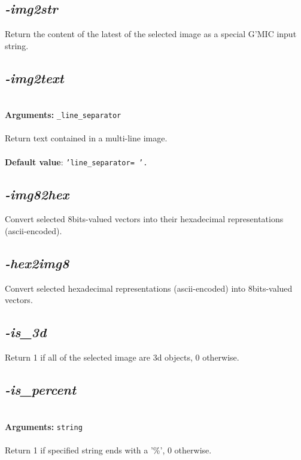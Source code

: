 \documentclass[a4paper,11pt,twoside]{book}
\begin{document}
\subsection{\emph{-img2str} }\vspace*{-0.5em}
Return the content of the latest of the selected image as a special G'MIC input string.


\subsection{\emph{-img2text} }\vspace*{-0.5em}
~\\\textbf{Arguments: } 
{\small \texttt{\_line\_separator}}\\~\\
Return text contained in a multi-line image.
~\\~\\\textbf{Default value}: {\small \texttt{'line\_separator= '.}}


\subsection{\emph{-img82hex} }\vspace*{-0.5em}
Convert selected 8bits-valued vectors into their hexadecimal representations (ascii-encoded).


\subsection{\emph{-hex2img8} }\vspace*{-0.5em}
Convert selected hexadecimal representations (ascii-encoded) into 8bits-valued vectors.


\subsection{\emph{-is\_3d} }\vspace*{-0.5em}
Return 1 if all of the selected image are 3d objects, 0 otherwise.


\subsection{\emph{-is\_percent} }\vspace*{-0.5em}
~\\\textbf{Arguments: } 
{\small \texttt{string}}\\~\\
Return 1 if specified string ends with a '\%', 0 otherwise.
\end{document}
